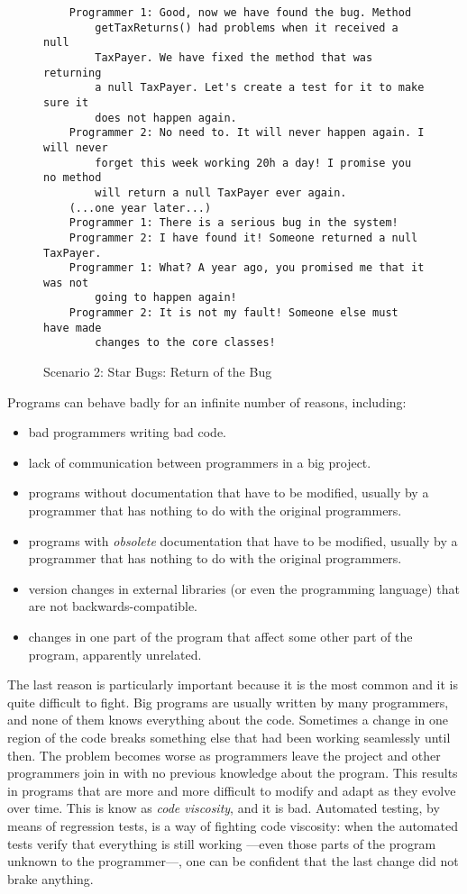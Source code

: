 \begin{figure}[tbp]
\begin{verbatim}
    Programmer 1: Good, now we have found the bug. Method 
        getTaxReturns() had problems when it received a null
        TaxPayer. We have fixed the method that was returning 
        a null TaxPayer. Let's create a test for it to make sure it
        does not happen again. 
    Programmer 2: No need to. It will never happen again. I will never
        forget this week working 20h a day! I promise you no method
        will return a null TaxPayer ever again. 
    (...one year later...)
    Programmer 1: There is a serious bug in the system!
    Programmer 2: I have found it! Someone returned a null TaxPayer. 
    Programmer 1: What? A year ago, you promised me that it was not
        going to happen again!
    Programmer 2: It is not my fault! Someone else must have made
        changes to the core classes!
\end{verbatim}  
  \caption{Scenario 2: Star Bugs: Return of the Bug}
  \label{fig:sdfsdsers}
\end{figure}

Programs can behave badly for an infinite number of reasons,
including: 

\begin{itemize}
\item bad programmers writing bad code.
\item lack of communication between programmers in a big project.
\item programs without documentation that have to be modified, usually
  by a programmer that has nothing to do with the original
  programmers.
\item programs with \emph{obsolete} documentation that have to be modified, usually
  by a programmer that has nothing to do with the original
  programmers.
\item version changes in external libraries (or even the programming
  language) that are not backwards-compatible.
\item changes in one part of the program that affect some other part of
  the program, apparently unrelated. 
\end{itemize}

The last reason is particularly important because it is the most
common and it is quite difficult to fight. Big programs are usually
written by many programmers, and none of them knows everything about
the code. Sometimes a change in one region of the code breaks something
else that had been working seamlessly until then. The problem becomes worse as
programmers leave the project and other programmers join in with no
previous knowledge about the program. 
This results in programs that
are more and more difficult to modify and adapt as they evolve over
time. This is know as \emph{code viscosity}, and it is bad. Automated
testing, by means of regression tests, is a way of fighting code
viscosity: when the automated tests verify that everything 
is still working ---even those parts of the program unknown to the
programmer---, one can be confident that the last change did
not brake anything. 

